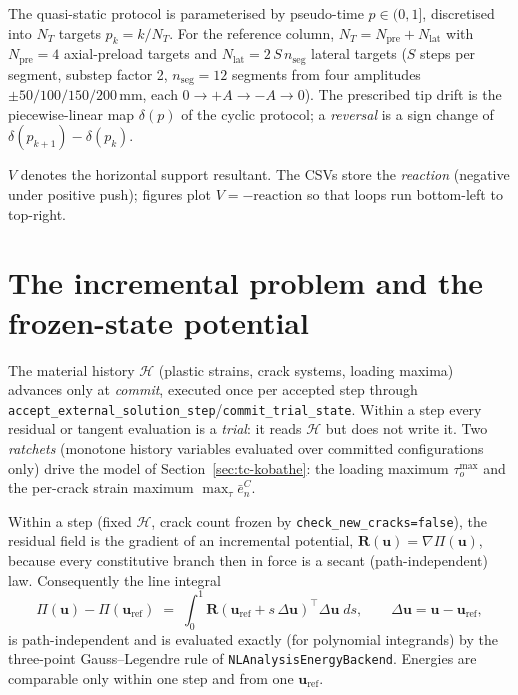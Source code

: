 \begin{definition}
The quasi-static protocol is parameterised by pseudo-time
$p\in(0,1]$, discretised into $N_T$ targets $p_k = k/N_T$. For the
reference column, $N_T = N_{\text{pre}} + N_{\text{lat}}$ with
$N_{\text{pre}}=4$ axial-preload targets and
$N_{\text{lat}} = 2\,S\,n_{\text{seg}}$ lateral targets ($S$ steps
per segment, substep factor 2, $n_{\text{seg}}=12$ segments from four
amplitudes $\pm50/100/150/200$\,mm, each $0\to+A\to-A\to0$). The
prescribed tip drift is the piecewise-linear map
$\delta(p)$ of the cyclic protocol; a \emph{reversal} is a sign
change of $\delta(p_{k+1})-\delta(p_k)$.
\end{definition}

\begin{definition}
$V$ denotes the horizontal support resultant. The CSVs store the
\emph{reaction} (negative under positive push); figures plot
$V=-\text{reaction}$ so that loops run bottom-left to top-right.
\end{definition}

\section{The incremental problem and the frozen-state potential}
\label{sec:tc-incremental}

\begin{definition}
The material history $\mathcal{H}$ (plastic strains, crack systems,
loading maxima) advances only at \emph{commit}, executed once per
accepted step through
\texttt{accept\_external\_solution\_step}/\texttt{commit\_trial\_state}.
Within a step every residual or tangent evaluation is a \emph{trial}:
it reads $\mathcal{H}$ but does not write it. Two \emph{ratchets}
(monotone history variables evaluated over committed configurations
only) drive the model of Section~\ref{sec:tc-kobathe}: the loading
maximum $\tau_o^{\max}$ and the per-crack strain maximum
$\max_\tau \bar e^{C}_n$.
\end{definition}

\begin{proposition}
\label{prop:tc-conservative}
Within a step (fixed $\mathcal{H}$, crack count frozen by
\texttt{check\_new\_cracks=false}), the residual field is the gradient
of an incremental potential, $\mathbf R(\mathbf u)=\nabla\Pi(\mathbf
u)$, because every constitutive branch then in force is a secant
(path-independent) law. Consequently the line integral
\[
  \Pi(\mathbf u)-\Pi(\mathbf u_{\mathrm{ref}})
  \;=\; \int_0^1 \mathbf R\!\left(\mathbf u_{\mathrm{ref}} +
        s\,\Delta\mathbf u\right)^{\!\top} \Delta\mathbf u \; ds,
  \qquad \Delta\mathbf u=\mathbf u-\mathbf u_{\mathrm{ref}},
\]
is path-independent and is evaluated exactly (for polynomial
integrands) by the three-point Gauss--Legendre rule of
\texttt{NLAnalysisEnergyBackend}. Energies are comparable only within
one step and from one $\mathbf u_{\mathrm{ref}}$.
\end{proposition}

